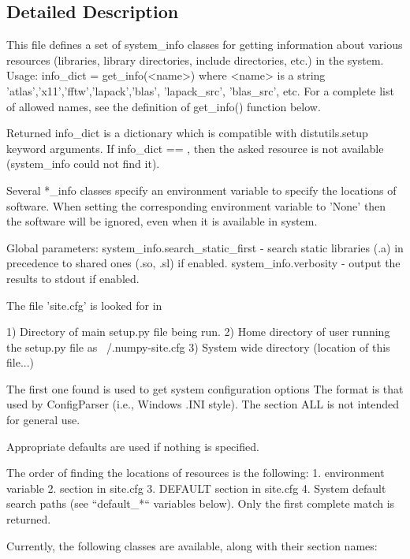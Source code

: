 \subsection{Detailed Description}
\begin{DoxyVerb}This file defines a set of system_info classes for getting
information about various resources (libraries, library directories,
include directories, etc.) in the system. Usage:
info_dict = get_info(<name>)
  where <name> is a string 'atlas','x11','fftw','lapack','blas',
  'lapack_src', 'blas_src', etc. For a complete list of allowed names,
  see the definition of get_info() function below.

  Returned info_dict is a dictionary which is compatible with
  distutils.setup keyword arguments. If info_dict == {}, then the
  asked resource is not available (system_info could not find it).

  Several *_info classes specify an environment variable to specify
  the locations of software. When setting the corresponding environment
  variable to 'None' then the software will be ignored, even when it
  is available in system.

Global parameters:
  system_info.search_static_first - search static libraries (.a)
         in precedence to shared ones (.so, .sl) if enabled.
  system_info.verbosity - output the results to stdout if enabled.

The file 'site.cfg' is looked for in

1) Directory of main setup.py file being run.
2) Home directory of user running the setup.py file as ~/.numpy-site.cfg
3) System wide directory (location of this file...)

The first one found is used to get system configuration options The
format is that used by ConfigParser (i.e., Windows .INI style). The
section ALL is not intended for general use.

Appropriate defaults are used if nothing is specified.

The order of finding the locations of resources is the following:
 1. environment variable
 2. section in site.cfg
 3. DEFAULT section in site.cfg
 4. System default search paths (see ``default_*`` variables below).
Only the first complete match is returned.

Currently, the following classes are available, along with their section names:


\end{DoxyVerb}
